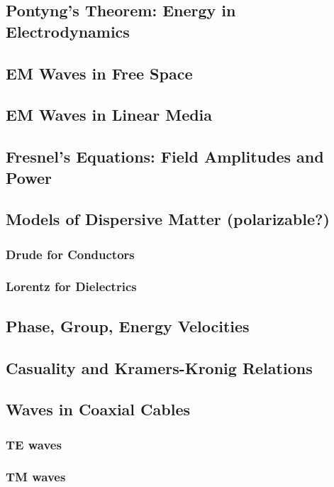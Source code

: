 \documentclass[]{article}
\begin{document}
\subsection{Pontyng's Theorem: Energy in Electrodynamics}

\subsection{EM Waves in Free Space}

\subsection{EM Waves in Linear Media}

\subsection{Fresnel's Equations: Field Amplitudes and Power}

\subsection{Models of Dispersive Matter (polarizable?)}
\subsubsection{Drude for Conductors}
\subsubsection{Lorentz for Dielectrics}

\subsection{Phase, Group, Energy Velocities}

\subsection{Casuality and Kramers-Kronig Relations}

\subsection{Waves in Coaxial Cables}
\subsubsection{TE waves}
\subsubsection{TM waves}
\end{document}

